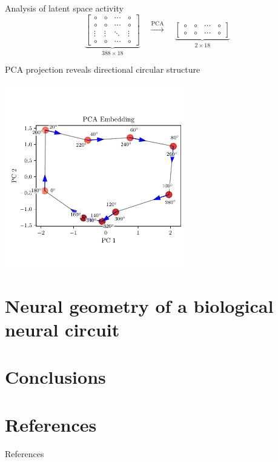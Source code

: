 \documentclass[aspectratio=169]{beamer}
\begin{document}
\begin{frame}{Analysis of latent space activity}
    \[
\underbrace{
\begin{bmatrix}
    \circ & \circ & \cdots & \circ \\
    \circ & \circ & \cdots & \circ \\
    \vdots & \vdots & \ddots & \vdots \\
    \circ & \circ & \cdots & \circ
\end{bmatrix}}_{388 \times 18}
\quad
\overset{\text{PCA}}{\longrightarrow}
\quad
\underbrace{
\begin{bmatrix}
    \circ & \circ & \cdots & \circ \\
    \circ & \circ & \cdots & \circ
\end{bmatrix}}_{2 \times 18}
\]
\end{frame}

\begin{frame}{PCA projection reveals directional circular structure}
    \begin{center}
        \includegraphics[width=0.6\textwidth,trim={0 1cm 0 1cm},clip]{results/ann_circular_colormap_visualization.pdf} 
    \end{center}
\end{frame}

\section{Neural geometry of a biological neural circuit}

\section{Conclusions}

\section{References}
\begin{frame}[allowframebreaks]{References}
    

\end{frame}
\end{document}
